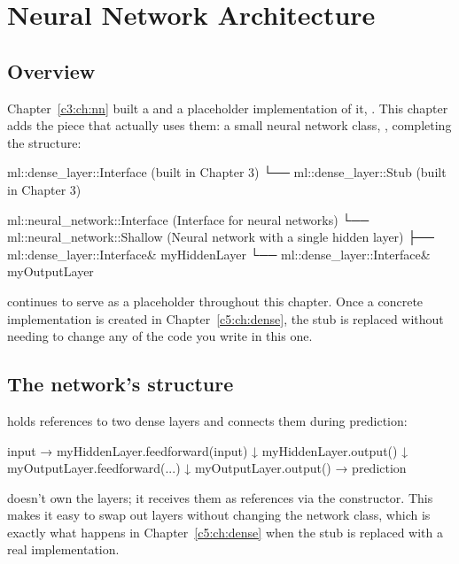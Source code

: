 
\section{Neural Network Architecture}
\label{c4:sec:architecture}\label{c4:app:a}

\subsection{Overview}
Chapter~\ref{c3:ch:nn} built a  and a placeholder implementation of
it, . This chapter adds the piece that actually uses them: a small neural
network class, , completing the structure:

\begin{console}
ml::dense_layer::Interface   (built in Chapter 3)
└── ml::dense_layer::Stub    (built in Chapter 3)

ml::neural_network::Interface   (Interface for neural networks)
└── ml::neural_network::Shallow (Neural network with a single hidden layer)
        ├── ml::dense_layer::Interface& myHiddenLayer
        └── ml::dense_layer::Interface& myOutputLayer
\end{console}

\noindent {} continues to serve as a placeholder throughout this chapter.
Once a concrete implementation is created in Chapter~\ref{c5:ch:dense}, the stub is replaced
without needing to change any of the code you write in this one.

\subsection{The network's structure}
 holds references to two dense layers and connects them during prediction:

\begin{console}
input → myHiddenLayer.feedforward(input)
               ↓
       myHiddenLayer.output()
               ↓
       myOutputLayer.feedforward(...)
               ↓
       myOutputLayer.output()  →  prediction
\end{console}

\noindent {} doesn't own the layers; it receives them as references via the
constructor. This makes it easy to swap out layers without changing the network class, which is
exactly what happens in Chapter~\ref{c5:ch:dense} when the stub is replaced with a real
implementation.

